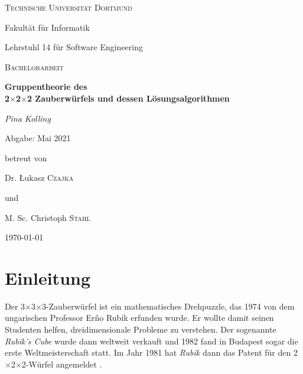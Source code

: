 \documentclass[12pt,a4paper, usenames, dvipsnames]{article}
\theoremstyle{mystyle}
\theoremstyle{definition}
\newcommand{\Ttwo}{2$\times$2$\times$2-}
\newcommand{\Tthree}{3$\times$3$\times$3-}
\begin{document}
\begin{titlepage}
	\centering
	{\scshape\LARGE Technische Universität Dortmund \par}
	Fakultät für Informatik \par
	Lehrstuhl 14 für Software Engineering \par
	\vspace{1cm}
	{\scshape\Large Bachelorarbeit \par }
	\vspace{1.5cm}
	{\huge\bfseries  Gruppentheorie des \\ 2$\times$2$\times$2 Zauberwürfels und dessen Lösungsalgorithmen \par}
	\vspace{2cm}
	{\Large\itshape Pina Kolling\par}
	\vspace{0.5cm}
	{Abgabe: Mai 2021 \par }
	\vfill
	betreut von\par
	Dr. \L ukasz \textsc{Czajka} \par 
	und \par 
	M. Sc. Christoph \textsc{Stahl} 

	\vfill

	{\large \today\par}
\end{titlepage}

\begin{singlespace}
\tableofcontents
\thispagestyle{empty} 
\end{singlespace}


\thispagestyle{empty} 



\newpage

\setcounter{page}{1} 
%

%
%
%
%
%
%
%
%
%
\section{Einleitung}

Der \Tthree Zauberwürfel ist ein mathematisches Drehpuzzle, das 1974 von dem ungarischen Professor Er\~{n}o Rubik erfunden wurde. Er wollte damit seinen Studenten helfen, dreidimensionale Probleme zu verstehen. 
Der sogenannte \textit{Rubik's Cube} wurde dann weltweit verkauft und 1982 fand in Budapest sogar die erste Weltmeisterschaft statt. \cite{RC}
Im Jahr 1981 hat \textit{Rubik} dann das Patent für den \Ttwo Würfel angemeldet \cite{patent}.
\end{document}
